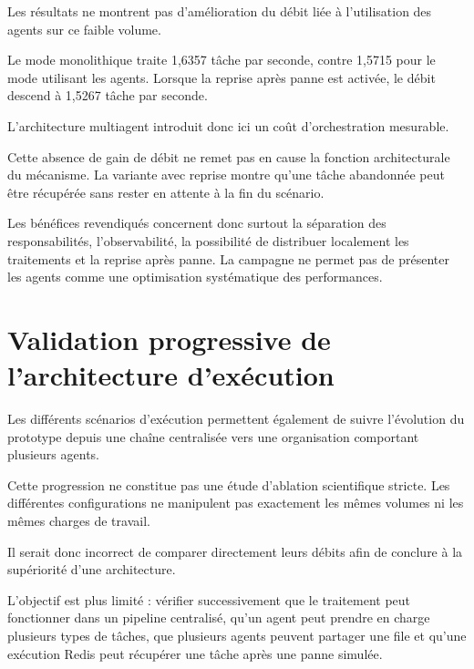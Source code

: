 Les résultats ne montrent pas d'amélioration du débit liée à l'utilisation des agents sur ce faible volume.

Le mode monolithique traite 1,6357 tâche par seconde, contre 1,5715 pour le mode utilisant les agents. Lorsque la reprise après panne est activée, le débit descend à 1,5267 tâche par seconde.

L'architecture multiagent introduit donc ici un coût d'orchestration mesurable.

Cette absence de gain de débit ne remet pas en cause la fonction architecturale du mécanisme. La variante avec reprise montre qu'une tâche abandonnée peut être récupérée sans rester en attente à la fin du scénario.

Les bénéfices revendiqués concernent donc surtout la séparation des responsabilités, l'observabilité, la possibilité de distribuer localement les traitements et la reprise après panne. La campagne ne permet pas de présenter les agents comme une optimisation systématique des performances.

\section{Validation progressive de l'architecture d'exécution}

Les différents scénarios d'exécution permettent également de suivre l'évolution du prototype depuis une chaîne centralisée vers une organisation comportant plusieurs agents.

Cette progression ne constitue pas une étude d'ablation scientifique stricte. Les différentes configurations ne manipulent pas exactement les mêmes volumes ni les mêmes charges de travail.

Il serait donc incorrect de comparer directement leurs débits afin de conclure à la supériorité d'une architecture.

L'objectif est plus limité : vérifier successivement que le traitement peut fonctionner dans un pipeline centralisé, qu'un agent peut prendre en charge plusieurs types de tâches, que plusieurs agents peuvent partager une file et qu'une exécution Redis peut récupérer une tâche après une panne simulée.

